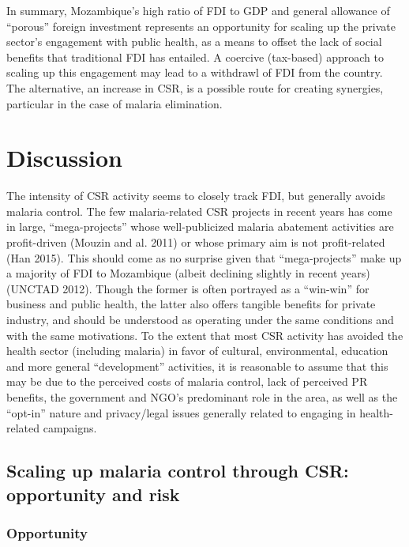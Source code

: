 \documentclass[]{article}
\begin{document}
In summary, Mozambique's high ratio of FDI to GDP and general allowance
of ``porous'' foreign investment represents an opportunity for scaling
up the private sector's engagement with public health, as a means to
offset the lack of social benefits that traditional FDI has entailed. A
coercive (tax-based) approach to scaling up this engagement may lead to
a withdrawl of FDI from the country. The alternative, an increase in
CSR, is a possible route for creating synergies, particular in the case
of malaria elimination.

\section{Discussion}\label{discussion}

The intensity of CSR activity seems to closely track FDI, but generally
avoids malaria control. The few malaria-related CSR projects in recent
years has come in large, ``mega-projects'' whose well-publicized malaria
abatement activities are profit-driven (Mouzin and al. 2011) or whose
primary aim is not profit-related (Han 2015). This should come as no
surprise given that ``mega-projects'' make up a majority of FDI to
Mozambique (albeit declining slightly in recent years) (UNCTAD 2012).
Though the former is often portrayed as a ``win-win'' for business and
public health, the latter also offers tangible benefits for private
industry, and should be understood as operating under the same
conditions and with the same motivations. To the extent that most CSR
activity has avoided the health sector (including malaria) in favor of
cultural, environmental, education and more general ``development''
activities, it is reasonable to assume that this may be due to the
perceived costs of malaria control, lack of perceived PR benefits, the
government and NGO's predominant role in the area, as well as the
``opt-in'' nature and privacy/legal issues generally related to engaging
in health-related campaigns.

\subsection{Scaling up malaria control through CSR: opportunity and
risk}\label{scaling-up-malaria-control-through-csr-opportunity-and-risk}

\subsubsection{Opportunity}\label{opportunity}
\end{document}
